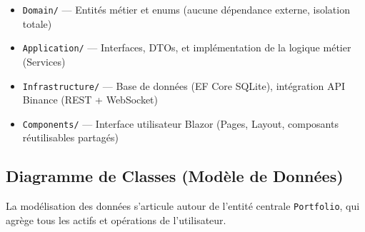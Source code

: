 \documentclass[12pt,a4paper]{article}
\begin{document}
\begin{infobox}
\begin{itemize}[leftmargin=1cm]
    \item \texttt{Domain/} --- Entités métier et enums (aucune dépendance externe, isolation totale)
    \item \texttt{Application/} --- Interfaces, DTOs, et implémentation de la logique métier (Services)
    \item \texttt{Infrastructure/} --- Base de données (EF Core SQLite), intégration API Binance (REST + WebSocket)
    \item \texttt{Components/} --- Interface utilisateur Blazor (Pages, Layout, composants réutilisables partagés)
\end{itemize}
\end{infobox}

\subsection{Diagramme de Classes (Modèle de Données)}

La modélisation des données s'articule autour de l'entité centrale \texttt{Portfolio}, qui agrège tous les actifs et opérations de l'utilisateur.
\end{document}
